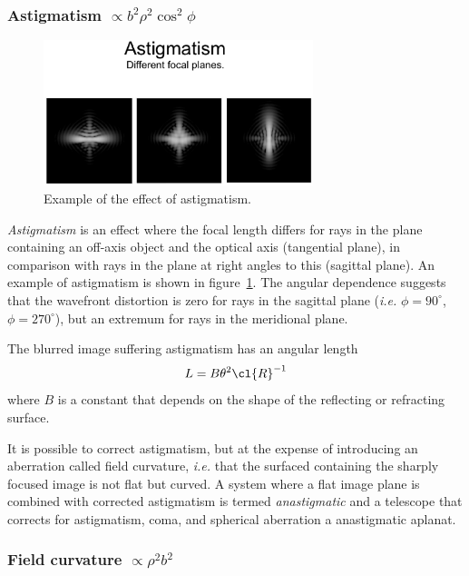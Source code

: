 \subsubsection{Astigmatism $\propto b^2\rho^2\cos^2\phi$}

\begin{figure}[th!]
	\centering
	\includegraphics[width=0.7\textwidth]{astigmatism-example.eps}
  \caption{Example of the effect of astigmatism.}
  \label{fig:astigmatism-example}
\end{figure}

{\it Astigmatism} is an effect where the focal length differs for rays in the plane
containing an off-axis object and the optical axis (tangential plane),
in comparison with rays in the plane at right angles to this (sagittal plane).
An example of astigmatism is shown in figure~\ref{fig:astigmatism-example}.
The angular dependence suggests that the wavefront distortion is zero for rays
in the sagittal plane ({\it i.e.} $\phi=90^{\circ}$, $\phi=270^{\circ}$), but an extremum for
rays in the meridional plane.

The blurred image suffering astigmatism has an angular length
\[
L=B\theta^2\cl{R}^{-1}
\]
where $B$ is a constant that depends on the shape of the reflecting or refracting surface.

It is possible to correct astigmatism, but at the expense of introducing
an aberration called field curvature, {\it i.e.} that the surfaced containing
the sharply focused image is not flat but curved. A system where a flat 
image plane is combined with corrected astigmatism is termed {\it anastigmatic}
and a telescope that corrects for astigmatism, coma, and spherical aberration a
anastigmatic aplanat. 

\subsubsection{Field curvature $\propto\rho^2 b^2$}

